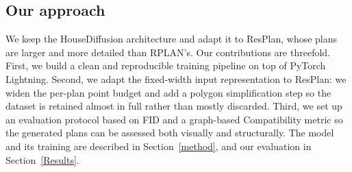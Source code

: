 \subsection{Our approach}
We keep the HouseDiffusion architecture and adapt it to ResPlan, whose plans are
larger and more detailed than RPLAN's. Our contributions are threefold. First, we
build a clean and reproducible training pipeline on top of PyTorch Lightning.
Second, we adapt the fixed-width input representation to ResPlan: we widen the
per-plan point budget and add a polygon simplification step so the dataset is
retained almost in full rather than mostly discarded. Third, we set up an
evaluation protocol based on FID and a graph-based Compatibility metric so the
generated plans can be assessed both visually and structurally. The model and its
training are described in Section~\ref{method}, and our evaluation in
Section~\ref{Results}.


